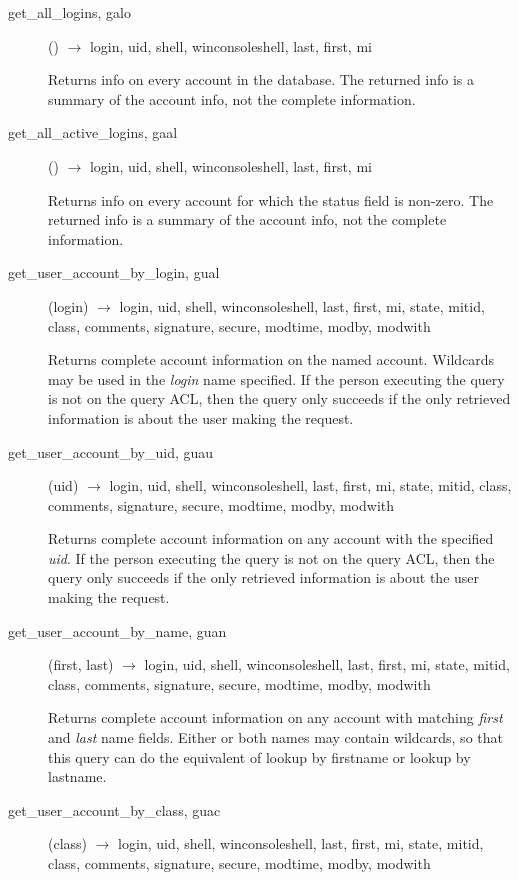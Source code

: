 \documentclass{article}
\begin{document}
\begin{description}
\item[get\_all\_logins, galo]() $\rightarrow$ login, uid, shell,
winconsoleshell, last, first, mi

Returns info on every account in the database.  The returned info is a
summary of the account info, not the complete information.

\item[get\_all\_active\_logins, gaal]() $\rightarrow$ login, uid, shell,
winconsoleshell, last, first, mi

Returns info on every account for which the status field is non-zero.
The returned info is a summary of the account info, not the complete
information.

\item[get\_user\_account\_by\_login, gual](login) $\rightarrow$ login, uid,
shell, winconsoleshell, last, first, mi, state, mitid, class, comments, signature,
secure, modtime, modby, modwith

Returns complete account information on the named account.  Wildcards
may be used in the {\em login} name specified.  If the person executing
the query is not on the query ACL, then the query only succeeds if the
only retrieved information is about the user making the request.

\item[get\_user\_account\_by\_uid, guau](uid) $\rightarrow$ login, uid, shell,
winconsoleshell, last, first, mi, state, mitid, class, comments, signature, secure,
modtime, modby, modwith

Returns complete account information on any account with the specified
{\em uid}.  If the person executing the query is not on the query ACL,
then the query only succeeds if the only retrieved information is
about the user making the request.

\item[get\_user\_account\_by\_name, guan](first, last) $\rightarrow$
login, uid, shell, winconsoleshell, 
last, first, mi, state, mitid, class, comments, signature, secure, modtime,
modby, modwith

Returns complete account information on any account with matching
{\em first} and {\em last} name fields.  Either or both names may contain
wildcards, so that this query can do the equivalent of lookup by
firstname or lookup by lastname.

\item[get\_user\_account\_by\_class, guac](class) $\rightarrow$ login,
uid, shell, winconsoleshell, last,
first, mi, state, mitid, class, comments, signature, secure, modtime,
modby, modwith


\end{description}
\end{document}

